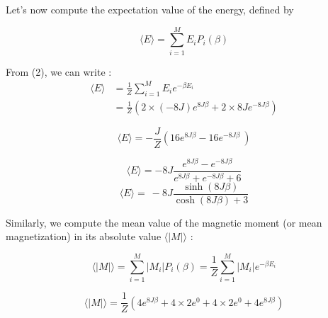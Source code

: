 \documentclass[a4paper, twoside, 11pt]{report}
\theoremstyle{theorem}
\theoremstyle{remark}
\theoremstyle{exemple}
\begin{document}
            Let's now compute the expectation value of the energy, defined by
            
                \begin{equation*}
                    \langle E \rangle = \sum\limits_{i=1}^{M}E_iP_i(\beta)
                \end{equation*}            
            
            From (2), we can write :
                \begin{align*}
                    \langle E \rangle &= \frac{1}{Z}\sum\limits_{i=1}^{M} E_i e^{-\beta E_i} \\
                    &= \frac{1}{Z} \left(2 \times (-8J) e^{8J\beta} + 2 \times 8J e^{-8J\beta}\right)
                \end{align*}             
            
                \begin{equation*}
                    \boxed{\langle E \rangle = -\frac{J}{Z}\left(16e^{8J\beta} - 16 e^{-8J\beta}\ \right)} 
                    \tag{5}
                \end{equation*}
                
                \begin{equation*}
                    \langle E \rangle = -8J \frac{e^{8J\beta} - e^{-8J\beta}}{e^{8J\beta} + e^{-8J\beta} + 6}
                \end{equation*}
                \begin{equation*}
                    \langle E \rangle =\ -8J \frac{\sinh (8J\beta)}{\cosh (8J\beta) + 3}  \tag{5'}
                \end{equation*}
            
            Similarly, we compute the mean value of the magnetic moment (or mean magnetization) in its absolute value $\langle |M| \rangle$ :
            
                \begin{equation*}
                    \langle |M| \rangle = \sum\limits_{i=1}^{M}|M_i|P_i(\beta) = \frac{1}{Z}\sum\limits_{i=1}^{M}|M_i| e^{-\beta E_i}
                \end{equation*}
                
                \begin{equation*}
                    \langle |M| \rangle = \frac{1}{Z} \left(4 e^{8J\beta} + 4 \times 2 e^{0} + 4 \times 2 e^{0} + 4 e^{8J\beta}\right) 
                \end{equation*}
                
\end{document}

